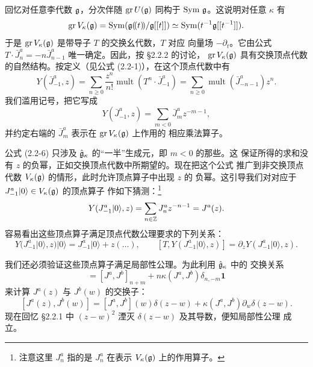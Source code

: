回忆对任意李代数 $\mathfrak{g}$，分次伴随 $\operatorname{gr}U(\mathfrak{g})$ 同构于
$\operatorname{Sym}\,\mathfrak{g}$。这说明对任意 $\kappa$ 有
\[
    \operatorname{gr}V_\kappa(\mathfrak{g})
    =\operatorname{Sym}(\mathfrak{g}(\!(t)\!)/\mathfrak{g}[[t]])
    \simeq\operatorname{Sym}(t^{-1}\mathfrak{g}[[t^{-1}]]).
\]
于是 $\operatorname{gr}V_\kappa(\mathfrak{g})$ 是带导子 $T$ 的交换幺代数，$T$ 对应
向量场 $-\partial_t$。它由公式
$T\cdot\bar J^a_n=-n\bar J^a_{n-1}$ 唯一确定。因此，按 \S2.2.2 的讨论，
$\operatorname{gr}V_\kappa(\mathfrak{g})$ 具有交换顶点代数的自然结构。按定义（见公式
(2.2-1)），在这个顶点代数中有
\[
    Y(\bar J^a_{-1},z)
    =\sum_{n\ge0}\frac{z^n}{n!}\operatorname{mult}(T^n\cdot\bar J^a_{-1})
    =\sum_{n\ge0}\operatorname{mult}(\bar J^a_{-n-1})z^n.
\]
我们滥用记号，把它写成
\begin{equation}
    Y(\bar J^a_{-1},z)=\sum_{m<0}\bar J^a_mz^{-m-1},
    \tag{2.2-6}
\end{equation}
并约定右端的 $\bar J^a_m$ 表示在 $\operatorname{gr}V_\kappa(\mathfrak{g})$ 上作用的
相应乘法算子。

公式 (2.2-6) 只涉及 $\hat{\mathfrak{g}}_\kappa$ 的“一半”生成元，即 $m<0$ 的那些。这
保证所得的求和没有 $z$ 的负幂，正如交换顶点代数中所期望的。现在把这个公式
推广到非交换顶点代数 $V_\kappa(\mathfrak{g})$ 的情形，此时允许顶点算子中出现 $z$ 的
负幂。这引导我们对对应于 $J^a_{-1}|0\rangle\in V_\kappa(\mathfrak{g})$ 的顶点算子
作如下猜测：\footnote{注意这里 $J^a_n$ 指的是 $J^a_n$ 在表示
$V_\kappa(\mathfrak{g})$ 上的作用算子。}
\[
    Y(J^a_{-1}|0\rangle,z)=\sum_{n\in\mathbb{Z}}J^a_nz^{-n-1}=J^a(z).
\]
容易看出这些顶点算子满足顶点代数公理要求的下列关系：
\[
    Y(J^a_{-1}|0\rangle,z)|0\rangle=J^a_{-1}|0\rangle+z(\dots),
    \qquad
    [T,Y(J^a_{-1}|0\rangle,z)]=\partial_zY(J^a_{-1}|0\rangle,z).
\]

我们还必须验证这些顶点算子满足局部性公理。为此利用 $\hat{\mathfrak{g}}_\kappa$ 中的
交换关系
\begin{equation}
    [J^a_n,J^b_m]=[J^a,J^b]_{n+m}+n\kappa(J^a,J^b)\delta_{n,-m}\mathbf{1}
    \tag{2.2-7}
\end{equation}
来计算 $J^a(z)$ 与 $J^b(w)$ 的交换子：
\[
    \left[J^a(z),J^b(w)\right]
    =\left[J^a,J^b\right](w)\delta(z-w)
    +\kappa(J^a,J^b)\partial_w\delta(z-w).
\]
现在回忆 \S2.2.1 中 $(z-w)^2$ 湮灭 $\delta(z-w)$ 及其导数，便知局部性公理
成立。

